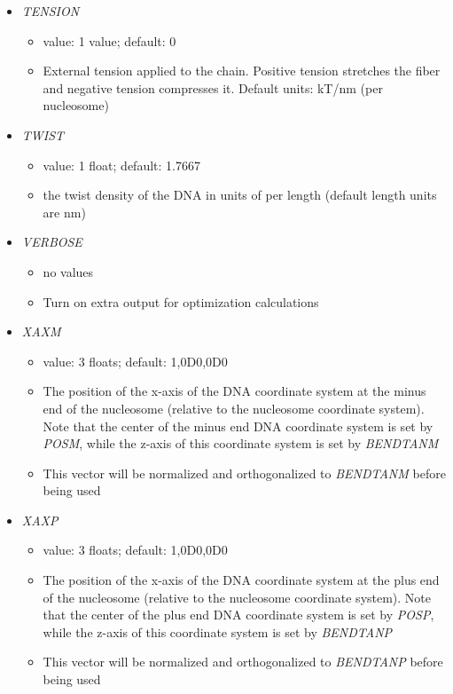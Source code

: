 \documentclass[12pt,dvips]{article}
\begin{document}
\begin{itemize}
%
\item {\it TENSION}
  \begin{itemize}
    \item value: 1 value; default: 0
    \item External tension applied to the chain. Positive tension stretches the fiber and negative tension compresses it. Default units: kT/nm (per nucleosome)
  \end{itemize}
%
\item {\it TWIST}
  \begin{itemize}
    \item value: 1 float; default: 1.7667
    \item the twist density of the DNA in units of per length (default length units are nm)
  \end{itemize}
%
\item {\it VERBOSE}
  \begin{itemize}
    \item no values
    \item Turn on extra output for optimization calculations
  \end{itemize}
%
\item {\it XAXM}
  \begin{itemize}
    \item value: 3 floats; default: 1,0D0,0D0
    \item The position of the x-axis of the DNA coordinate system at the minus end of the nucleosome (relative to the nucleosome coordinate system). Note that the center of the minus end DNA coordinate system is set by {\em POSM}, while the z-axis of this coordinate system is set by {\em BENDTANM}
    \item This vector will be normalized and orthogonalized to {\em BENDTANM} before being used
  \end{itemize}
%
\item {\it XAXP}
  \begin{itemize}
    \item value: 3 floats; default: 1,0D0,0D0
    \item The position of the x-axis of the DNA coordinate system at the plus end of the nucleosome (relative to the nucleosome coordinate system). Note that the center of the plus end DNA coordinate system is set by {\em POSP}, while the z-axis of this coordinate system is set by {\em BENDTANP}
    \item This vector will be normalized and orthogonalized to {\em BENDTANP} before being used
  \end{itemize}

\end{itemize}

 

\end{document}

